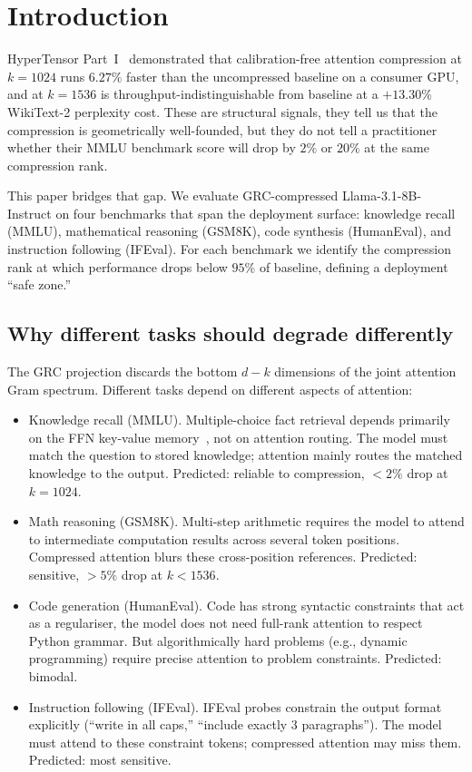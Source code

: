 \documentclass[11pt]{article}
\begin{document}
\section{Introduction}
\label{sec:intro}

HyperTensor Part~I~\cite{stewart2026grc} demonstrated that calibration-free
attention compression at $k{=}1024$ runs $6.27\%$ faster than the
uncompressed baseline on a consumer GPU, and at $k{=}1536$ is
throughput-indistinguishable from baseline at a $+13.30\%$ WikiText-2
perplexity cost.  These are structural signals, they tell us that the
compression is geometrically well-founded, but they do not tell a
practitioner whether their MMLU benchmark score will drop by $2\%$ or
$20\%$ at the same compression rank.

This paper bridges that gap.  We evaluate GRC-compressed
Llama-3.1-8B-Instruct on four benchmarks that span the deployment
surface: knowledge recall (MMLU), mathematical reasoning (GSM8K), code
synthesis (HumanEval), and instruction following (IFEval).  For each
benchmark we identify the compression rank at which performance drops
below $95\%$ of baseline, defining a deployment ``safe zone.''

\subsection{Why different tasks should degrade differently}

The GRC projection discards the bottom $d-k$ dimensions of the joint
attention Gram spectrum.  Different tasks depend on different aspects of
attention:

\begin{itemize}
\item Knowledge recall (MMLU).  Multiple-choice fact retrieval
      depends primarily on the FFN key-value memory~\cite{geva2021ffn},
      not on attention routing.  The model must match the question to
      stored knowledge; attention mainly routes the matched knowledge
      to the output.  Predicted: reliable to compression, $<2\%$ drop at
      $k{=}1024$.

\item Math reasoning (GSM8K).  Multi-step arithmetic requires
      the model to attend to intermediate computation results across
      several token positions.  Compressed attention blurs these
      cross-position references.  Predicted: sensitive, $>5\%$ drop
      at $k{<}1536$.

\item Code generation (HumanEval).  Code has strong syntactic
      constraints that act as a regulariser, the model does not need
      full-rank attention to respect Python grammar.  But algorithmically
      hard problems (e.g., dynamic programming) require precise
      attention to problem constraints.  Predicted: bimodal.

\item Instruction following (IFEval).  IFEval probes constrain
      the output format explicitly (``write in all caps,'' ``include
      exactly 3 paragraphs'').  The model must attend to these
      constraint tokens; compressed attention may miss them.  Predicted:
      most sensitive.
\end{itemize}
\end{document}
